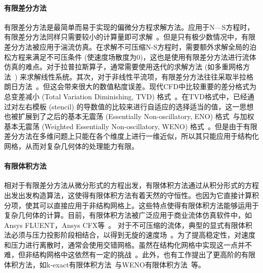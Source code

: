 \paragraph{有限差分方法}
有限差分方法是最简单而易于实现的偏微分方程求解方法。应用于N—S方程时，有限差分方法同样只需要较小的计算量即可求解~\cite{vreman2014comparison, kooij2018comparison}。但是只有极少数情况中，有限差分方法被应用于湍流仿真。在求解不可压缩N-S方程时，需要额外求解全局的泊松方程来满足不可压条件 (使速度场散度为0)，这也是使用有限差分方法进行流体仿真的难点。对于拉普拉斯算子，通常需要使用迭代的求解方法 (如多重网格方法~\cite{golub2013matrix}) 来求解线性系统。其次，对于非线性平流项，有限差分方法往往采取半拉格朗日方法~\cite{smolarkiewicz1992class}。但这会带来很大的数值粘度误差。现代CFD中比较重要的差分格式为总变差减小 (Total Variation Diminishing, TVD) 格式~\cite{HARTEN1983357, osher1986very, YEE1985327}。在TVD格式中，已经通过对左右模板 (stencil) 的导数值的比较来进行自适应的选择适当的值，这一思想也被扩展到了之后的基本无震荡 (Essentially Non-oscillatory, ENO) 格式~\cite{HARTEN19973, SHU1988439, SHU198932}与加权基本无震荡 (Weighted Essentially Non-oscillatory, WENO) 格式~\cite{LIU1994200}。但是由于有限差分方法在多维问题上只能在各个维度上进行一维近似，所以其只能应用于结构化网格，从而对复杂几何体的处理能力有限。

\paragraph{有限体积方法}
相对于有限差分方法从微分形式的方程出发，有限体积方法通过从积分形式的方程出发出发构造算法，这使得有限体积方法有着天然的守恒性。也因为它直接计算积分项，使其可以直接应用于非结构网格上。这些特点使得有限体积方法能够运用于复杂几何体的计算。目前，有限体积方法被广泛应用于商业流体仿真软件中，如Ansys FLUENT，Ansys CFX等~\cite{JEONG201419}。 
对于不可压缩的流体，典型的显式有限体积法必须与压力投影阶段相结合，以得到无旋的速度场~\cite{pember1996higher, https://doi.org/10.1002/fld.310}。为了提高稳定性，对速度和压力进行离散时，通常会使用交错网格。虽然在结构化网格中实现这一点并不难，但非结构网格中这依然有一定的挑战~\cite{bermudez1998upwind, herbin2012staggered, gao2012unstructured}。此外，也有工作提出了更高阶的有限体积方法，如k-exact有限体积方法~\cite{barth1990higher}与WENO有限体积方法~\cite{HU199997}等。

